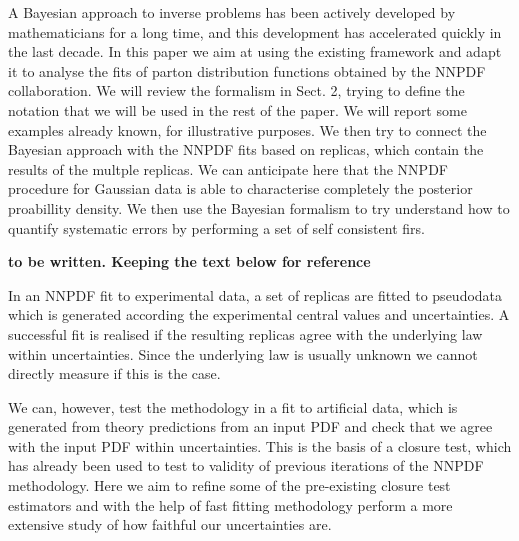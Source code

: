 A Bayesian approach to inverse problems has been actively developed by
mathematicians for a long time, and this development has accelerated quickly in
the last decade. In this paper we aim at using the existing framework and adapt
it to analyse the fits of parton distribution functions obtained by the NNPDF
collaboration. We will review the formalism in Sect. 2, trying to define the
notation that we will be used in the rest of the paper. We will report some
examples already known, for illustrative purposes. We then try to connect the
Bayesian approach with the NNPDF fits based on replicas, which contain the
results of the multple replicas. We can anticipate here that the NNPDF procedure
for Gaussian data is able to characterise completely the posterior proabillity
density. We then use the Bayesian formalism to try understand how to quantify systematic errors by performing a set of self consistent firs. 






{\bf to be written. Keeping the text below for reference}

In an NNPDF fit to experimental data, a set of replicas are fitted to pseudodata
which is generated according the experimental central values and uncertainties.
A successful fit is realised if the resulting replicas agree with the underlying
law within uncertainties. Since the underlying law is usually unknown we cannot
directly measure if this is the case.

We can, however, test the methodology in a fit to artificial data, which is
generated from theory predictions from an input PDF and check that we agree with
the input PDF within uncertainties. This is the basis of a closure test, which
has already been used to test to validity of previous iterations of the NNPDF
methodology. Here we aim to refine some of the pre-existing closure test
estimators and with the help of fast fitting methodology perform a more
extensive study of how faithful our uncertainties are.
